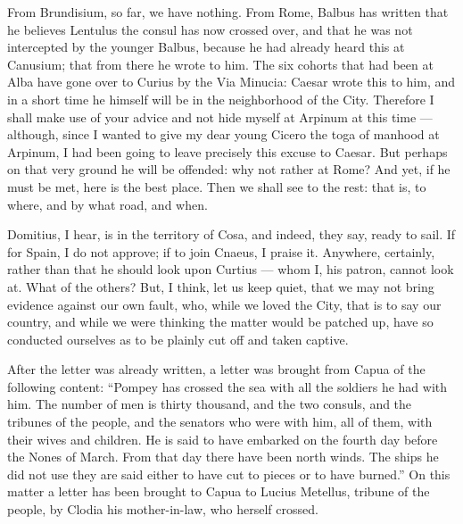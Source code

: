 

 From Brundisium, so far, we have nothing. From Rome, Balbus has written that he believes Lentulus the consul has now crossed over, and that he was not intercepted by the younger Balbus, because he had already heard this at Canusium; that from there he wrote to him. The six cohorts that had been at Alba have gone over to Curius by the Via Minucia: Caesar wrote this to him, and in a short time he himself will be in the neighborhood of the City. Therefore I shall make use of your advice and not hide myself at Arpinum at this time --- although, since I wanted to give my dear young Cicero the toga of manhood at Arpinum, I had been going to leave precisely this excuse to Caesar. But perhaps on that very ground he will be offended: why not rather at Rome? And yet, if he must be met, here is the best place. Then we shall see to the rest: that is, to where, and by what road, and when.

 Domitius, I hear, is in the territory of Cosa, and indeed, they say, ready to sail. If for Spain, I do not approve; if to join Cnaeus, I praise it. Anywhere, certainly, rather than that he should look upon Curtius --- whom I, his patron, cannot look at. What of the others? But, I think, let us keep quiet, that we may not bring evidence against our own fault, who, while we loved the City, that is to say our country, and while we were thinking the matter would be patched up, have so conducted ourselves as to be plainly cut off and taken captive.

 After the letter was already written, a letter was brought from Capua of the following content: ``Pompey has crossed the sea with all the soldiers he had with him. The number of men is thirty thousand, and the two consuls, and the tribunes of the people, and the senators who were with him, all of them, with their wives and children. He is said to have embarked on the fourth day before the Nones of March. From that day there have been north winds. The ships he did not use they are said either to have cut to pieces or to have burned.'' On this matter a letter has been brought to Capua to Lucius Metellus, tribune of the people, by Clodia his mother-in-law, who herself crossed.

